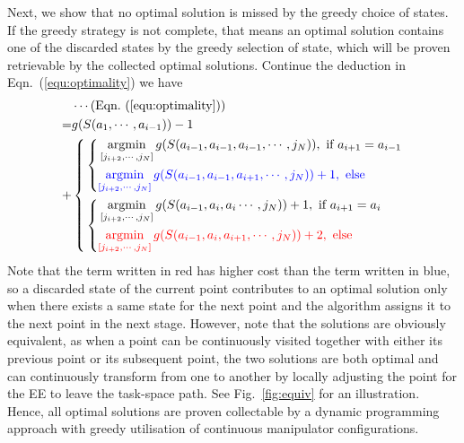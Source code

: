 \documentclass[letterpaper, 10 pt, conference]{ieeeconf}  %
\begin{document}
Next, we show that no optimal solution is missed by the greedy choice of states. 
If the greedy strategy is not complete, that means an optimal solution contains one of the discarded states by the greedy selection of state, which will be proven retrievable by the collected optimal solutions. 
Continue the deduction in Eqn.~(\ref{equ:optimality}) we have 
\begin{equation}
\begin{aligned}
&\cdots (\mbox{Eqn.}~(\ref{equ:optimality}))\\
=&g(S(a_1, \cdots, a_{i-1})) - 1 \\
+&\left\{
\begin{aligned}
	&\left\{
	\begin{aligned}
		&\mathop{\rm argmin}\limits_{[j_{i+2}, \cdots, j_N]} g(S(a_{i-1}, a_{i-1}, a_{i-1}, \cdots, j_N)), \mbox{ if } a_{i+1}=a_{i-1}\\
		&{\color{blue}\mathop{\rm argmin}\limits_{[j_{i+2}, \cdots, j_N]} g(S(a_{i-1}, a_{i-1}, a_{i+1}, \cdots, j_N))+1, \mbox{ else }}
	\end{aligned}
	\right.\\
  &\left\{
	\begin{aligned}
		&\mathop{\rm argmin}\limits_{[j_{i+2}, \cdots, j_N]} g(S(a_{i-1}, a_i, a_i\cdots, j_N))+1, \mbox{ if }a_{i+1}= a_i\\
		&{\color{red}\mathop{\rm argmin}\limits_{[j_{i+2}, \cdots, j_N]} g(S(a_{i-1}, a_i, a_{i+1}, \cdots, j_N))+2, \mbox{ else }}
	\end{aligned}
	\right.
\end{aligned}
\right.
\end{aligned}
\end{equation}
Note that the term written in red has higher cost than the term written in blue, so a discarded state of the current point contributes to an optimal solution only when there exists a same state for the next point and the algorithm assigns it to the next point in the next stage. 
However, note that the solutions are obviously equivalent, as when a point can be continuously visited together with either its previous point or its subsequent point, the two solutions are both optimal and can continuously transform from one to another by locally adjusting the point for the EE to leave the task-space path.
See Fig.~\ref{fig:equiv} for an illustration. 
Hence, all optimal solutions are proven collectable by a  dynamic programming approach with greedy utilisation of continuous manipulator configurations. 
\end{document}
